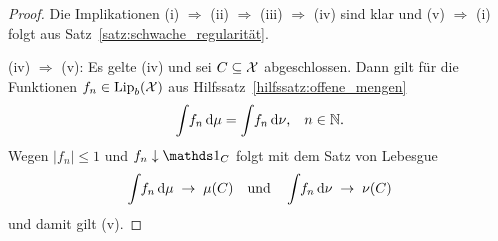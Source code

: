 \documentclass[../thesis/thesis.tex]{subfiles}
\begin{document}
	\begin{proof}
		Die Implikationen (i) $\Rightarrow$ (ii) $\Rightarrow$ (iii) $\Rightarrow$ (iv) sind klar und (v) 
		$\Rightarrow$ (i) folgt aus Satz~\ref{satz:schwache_regularität}.
		
		(iv) $\Rightarrow$ (v): Es gelte (iv) und sei $C \subseteq \mathcal{X}$ abgeschlossen. 
		Dann gilt für die Funktionen $f_n \in \mathrm{Lip}_b(\mathcal{X})$ aus Hilfssatz~\ref{hilfssatz:offene_mengen}
		$$\int_{} \, f_n \, \mathrm{d}\mu = \int_{} \, f_n \, \mathrm{d}\nu\text{,} \quad n \in \mathbb{N} \text{.}$$
		Wegen $| f_n | \leq 1$ und $f_n \convdown \indfct_C$ folgt mit dem Satz von Lebesgue 
		$$\int_{} \, f_n \, \mathrm{d}\mu \; \to \; \mu(C) \quad \text{und} \quad \int_{} \, f_n \, \mathrm{d}\nu 
		\; \to \; \nu(C)$$
		und damit gilt (v).
	\end{proof}
	
\end{document}
